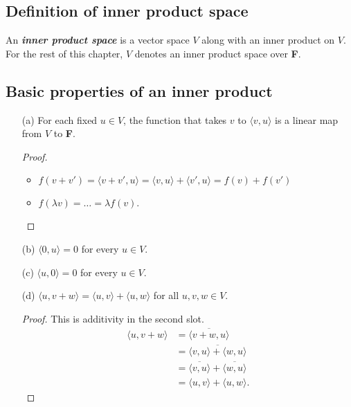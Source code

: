 \documentclass[11pt]{article}
\begin{document}
    \subsection{Definition of inner product space}

    An \textbf{\emph{inner product space}} is a vector space $V$ along with an inner product on $V$. For the rest of this chapter, $V$ denotes an inner product space over \textbf{F}. 

    \subsection{Basic properties of an inner product}

    \begin{enumerate}
        \item[(a)] For each fixed \(u \in V\), the function that takes $v$ to \(\langle v,u \rangle\) is a linear map from $V$ to \textbf{F}.
        \begin{proof}
            \begin{itemize}
                \item \(f(v+v') = \langle v+ v', u \rangle = \langle v,u \rangle + \langle v', u \rangle = f(v) + f(v')\)
                \item \(f(\lambda v) = \dots = \lambda f(v).\)
            \end{itemize}
        \end{proof} 
        \item[(b)] \(\langle 0,u \rangle = 0\) for every \(u \in V\).
        \item[(c)] \(\langle u,0 \rangle = 0\) for every \(u \in V\).
        \item[(d)] \(\langle u,v+w \rangle = \langle u,v \rangle + \langle u,w \rangle\) for all \(u,v,w \in V\).  
        \begin{proof}
            This is additivity in the second slot.
            \begin{align*}
                \langle u,v+w \rangle &= \overline{\langle v+w, u \rangle} \\
                                      &= \overline{\langle v,u \rangle + \langle w, u \rangle} \\
                                      &= \overline{\langle v,u \rangle} + \overline{\langle w,u \rangle} \\
                                      &= \langle u,v \rangle + \langle u,w \rangle. 
            \end{align*}

\end{proof}
\end{enumerate}
\end{document}
